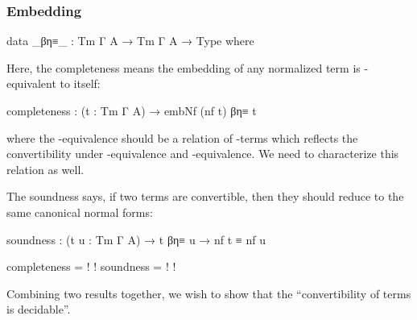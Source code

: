 \subsubsection*{Embedding}


\begin{code}[hide]
data _βη≡_ : Tm Γ A → Tm Γ A → Type where
\end{code}

Here, the completeness means the embedding of any normalized term is \beta\eta-equivalent to itself:

\begin{code}
completeness : (t : Tm Γ A) → embNf (nf t) βη≡ t
\end{code}

where the \beta\eta-equivalence should be a relation of \lambda-terms which reflects the convertibility under \beta-equivalence and \eta-equivalence. We need to characterize this relation as well.

The soundness says, if two terms are convertible, then they should reduce to the same canonical normal forms:

\begin{code}
soundness : (t u : Tm Γ A) → t βη≡ u → nf t ≡ nf u
\end{code}

\begin{code}[hide]
completeness = {!   !}
soundness = {!   !}
\end{code}

Combining two results together, we wish to show that the ``convertibility of terms is decidable''.